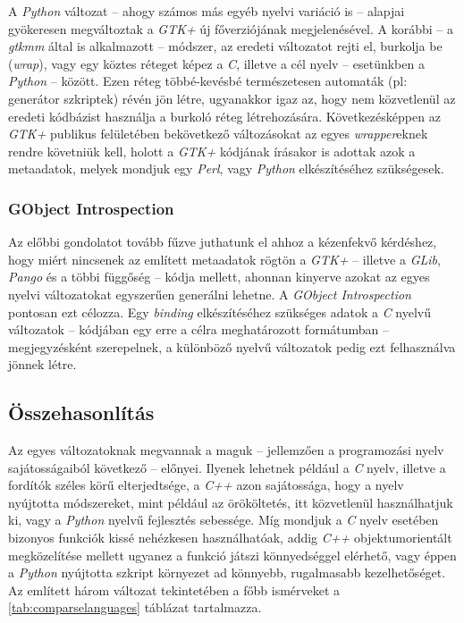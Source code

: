 A \textit{Python} változat -- ahogy számos más egyéb nyelvi variáció is -- alapjai gyökeresen megváltoztak a \textit{GTK+} új főverziójának megjelenésével. A korábbi -- a \textit{gtkmm} által is alkalmazott -- módszer, az eredeti változatot rejti el, burkolja be (\textit{wrap}), vagy egy köztes réteget képez a \textit{C}, illetve a cél nyelv -- esetünkben a \textit{Python} -- között. Ezen réteg többé-kevésbé természetesen automaták (pl: generátor szkriptek) révén jön létre, ugyanakkor igaz az, hogy nem közvetlenül az eredeti kódbázist használja a burkoló réteg létrehozására. Következésképpen az \textit{GTK+} publikus felületében bekövetkező változásokat az egyes \textit{wrapper}eknek rendre követniük kell, holott a \textit{GTK+} kódjának írásakor is adottak azok a metaadatok, melyek mondjuk egy \textit{Perl}, vagy \textit{Python} elkészítéséhez szükségesek.

\subsubsection{GObject Introspection}

Az előbbi gondolatot tovább fűzve juthatunk el ahhoz a kézenfekvő kérdéshez, hogy miért nincsenek az említett metaadatok rögtön a \textit{GTK+} -- illetve a \textit{GLib}, \textit{Pango} és a többi függőség -- kódja mellett, ahonnan kinyerve azokat az egyes nyelvi változatokat egyszerűen generálni lehetne. A \textit{GObject Introspection} pontosan ezt célozza. Egy \textit{binding} elkészítéséhez szükséges adatok a \textit{C} nyelvű változatok -- kódjában egy erre a célra meghatározott formátumban -- megjegyzésként szerepelnek, a különböző nyelvű változatok pedig ezt felhasználva jönnek létre.

\subsection{Összehasonlítás}

Az egyes változatoknak megvannak a maguk -- jellemzően a programozási nyelv sajátosságaiból következő -- előnyei. Ilyenek lehetnek például a \textit{C} nyelv, illetve a fordítók széles körű elterjedtsége, a \textit{C++} azon sajátossága, hogy a nyelv nyújtotta módszereket, mint például az örököltetés, itt közvetlenül használhatjuk ki, vagy a \textit{Python} nyelvű fejlesztés sebessége. Míg mondjuk a \textit{C} nyelv esetében bizonyos funkciók kissé nehézkesen használhatóak, addig \textit{C++} objektumorientált megközelítése mellett ugyanez a funkció játszi könnyedséggel elérhető, vagy éppen a \textit{Python} nyújtotta szkript környezet ad könnyebb, rugalmasabb kezelhetőséget. Az említett három változat tekintetében a főbb ismérveket a \ref{tab:comparselanguages} táblázat tartalmazza.

